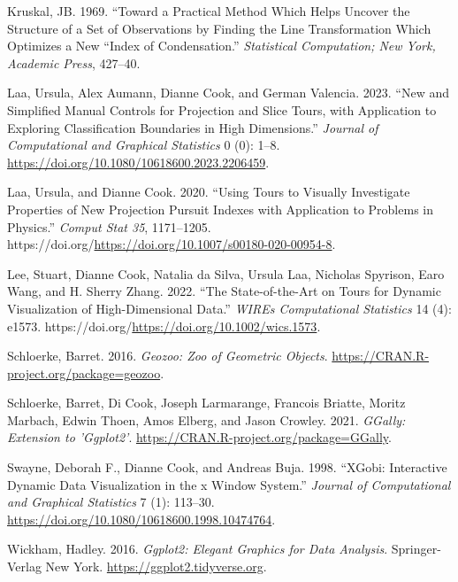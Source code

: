 \begin{CSLReferences}{1}{0}
\leavevmode{}%
Kruskal, JB. 1969. {``Toward a Practical Method Which Helps Uncover the Structure of a Set of Observations by Finding the Line Transformation Which Optimizes a New ``Index of Condensation.''} \emph{Statistical Computation; New York, Academic Press}, 427--40.

\leavevmode{}%
Laa, Ursula, Alex Aumann, Dianne Cook, and German Valencia. 2023. {``New and Simplified Manual Controls for Projection and Slice Tours, with Application to Exploring Classification Boundaries in High Dimensions.''} \emph{Journal of Computational and Graphical Statistics} 0 (0): 1--8. \url{https://doi.org/10.1080/10618600.2023.2206459}.

\leavevmode{}%
Laa, Ursula, and Dianne Cook. 2020. {``Using Tours to Visually Investigate Properties of New Projection Pursuit Indexes with Application to Problems in Physics.''} \emph{Comput Stat 35}, 1171--1205. https://doi.org/\url{https://doi.org/10.1007/s00180-020-00954-8}.

\leavevmode{}%
Lee, Stuart, Dianne Cook, Natalia da Silva, Ursula Laa, Nicholas Spyrison, Earo Wang, and H. Sherry Zhang. 2022. {``The State-of-the-Art on Tours for Dynamic Visualization of High-Dimensional Data.''} \emph{WIREs Computational Statistics} 14 (4): e1573. https://doi.org/\url{https://doi.org/10.1002/wics.1573}.

\leavevmode{}%
Schloerke, Barret. 2016. \emph{Geozoo: Zoo of Geometric Objects}. \url{https://CRAN.R-project.org/package=geozoo}.

\leavevmode{}%
Schloerke, Barret, Di Cook, Joseph Larmarange, Francois Briatte, Moritz Marbach, Edwin Thoen, Amos Elberg, and Jason Crowley. 2021. \emph{GGally: Extension to 'Ggplot2'}. \url{https://CRAN.R-project.org/package=GGally}.

\leavevmode{}%
Swayne, Deborah F., Dianne Cook, and Andreas Buja. 1998. {``XGobi: Interactive Dynamic Data Visualization in the x Window System.''} \emph{Journal of Computational and Graphical Statistics} 7 (1): 113--30. \url{https://doi.org/10.1080/10618600.1998.10474764}.

\leavevmode{}%
Wickham, Hadley. 2016. \emph{Ggplot2: Elegant Graphics for Data Analysis}. Springer-Verlag New York. \url{https://ggplot2.tidyverse.org}.


\end{CSLReferences}
